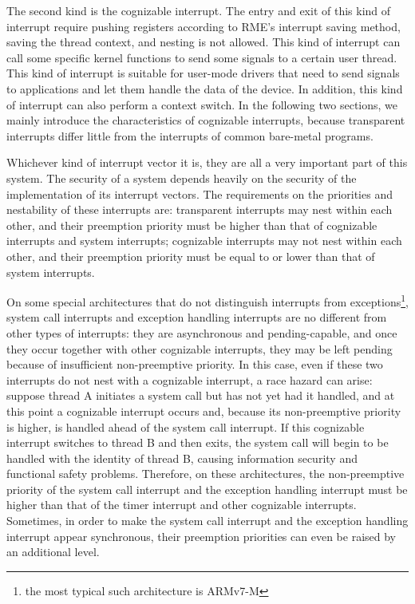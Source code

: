 The second kind is the cognizable interrupt. The entry and exit of this kind of interrupt require pushing registers according to RME's interrupt saving method, saving the thread context, and nesting is not allowed. This kind of interrupt can call some specific kernel functions to send some signals to a certain user thread. This kind of interrupt is suitable for user-mode drivers that need to send signals to applications and let them handle the data of the device. In addition, this kind of interrupt can also perform a context switch. In the following two sections, we mainly introduce the characteristics of cognizable interrupts, because transparent interrupts differ little from the interrupts of common bare-metal programs.

Whichever kind of interrupt vector it is, they are all a very important part of this system. The security of a system depends heavily on the security of the implementation of its interrupt vectors. The requirements on the priorities and nestability of these interrupts are: transparent interrupts may nest within each other, and their preemption priority must be higher than that of cognizable interrupts and system interrupts; cognizable interrupts may not nest within each other, and their preemption priority must be equal to or lower than that of system interrupts.

On some special architectures that do not distinguish interrupts from exceptions\footnote{the most typical such architecture is ARMv7-M}, system call interrupts and exception handling interrupts are no different from other types of interrupts: they are asynchronous and pending-capable, and once they occur together with other cognizable interrupts, they may be left pending because of insufficient non-preemptive priority. In this case, even if these two interrupts do not nest with a cognizable interrupt, a race hazard can arise: suppose thread A initiates a system call but has not yet had it handled, and at this point a cognizable interrupt occurs and, because its non-preemptive priority is higher, is handled ahead of the system call interrupt. If this cognizable interrupt switches to thread B and then exits, the system call will begin to be handled with the identity of thread B, causing information security and functional safety problems. Therefore, on these architectures, the non-preemptive priority of the system call interrupt and the exception handling interrupt must be higher than that of the timer interrupt and other cognizable interrupts. Sometimes, in order to make the system call interrupt and the exception handling interrupt appear synchronous, their preemption priorities can even be raised by an additional level.

